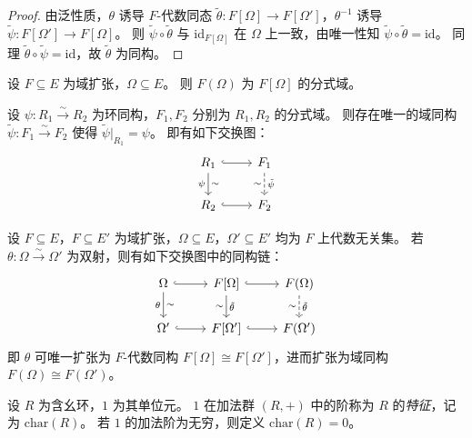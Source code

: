 \documentclass[lang=cn,a4paper,newtx]{elegantbook}
\begin{document}
\begin{proof}
  由泛性质，$\theta$ 诱导 $F$-代数同态 $\tilde\theta\colon F[\Omega]\to F[\Omega']$，$\theta^{-1}$ 诱导 $\tilde\psi\colon F[\Omega']\to F[\Omega]$。
  则 $\tilde\psi\circ\tilde\theta$ 与 $\mathrm{id}_{F[\Omega]}$ 在 $\Omega$ 上一致，由唯一性知 $\tilde\psi\circ\tilde\theta=\mathrm{id}$。
  同理 $\tilde\theta\circ\tilde\psi=\mathrm{id}$，故 $\tilde\theta$ 为同构。
\end{proof}

\begin{proposition}
  设 $F\subseteq E$ 为域扩张，$\Omega\subseteq E$。
  则 $F(\Omega)$ 为 $F[\Omega]$ 的分式域。
\end{proposition}

\begin{proposition}
  设 $\psi\colon R_1\xrightarrow{\sim} R_2$ 为环同构，$F_1,F_2$ 分别为 $R_1,R_2$ 的分式域。
  则存在唯一的域同构 $\tilde\psi\colon F_1\xrightarrow{\sim} F_2$ 使得 $\tilde\psi\big|_{R_1}=\psi$。
  即有如下交换图：
  \[
    \begin{tikzcd}
      R_1 \arrow[r,hook] \arrow[d,"\psi"',"\sim"] & F_1 \arrow[d,dashed,"\tilde\psi","\sim"'] \\
      R_2 \arrow[r,hook] & F_2
    \end{tikzcd}
  \]
\end{proposition}

\begin{corollary}
  设 $F\subseteq E$，$F\subseteq E'$ 为域扩张，$\Omega\subseteq E$，$\Omega'\subseteq E'$ 均为 $F$ 上代数无关集。
  若 $\theta\colon\Omega\xrightarrow{\sim}\Omega'$ 为双射，则有如下交换图中的同构链：
  \[
    \begin{tikzcd}
      \Omega \arrow[r,hook] \arrow[d,"\theta"',"\sim"] & F[\Omega] \arrow[r,hook] \arrow[d,"\tilde\theta","\sim"'] & F(\Omega) \arrow[d,dashed,"\tilde\theta","\sim"'] \\
      \Omega' \arrow[r,hook] & F[\Omega'] \arrow[r,hook] & F(\Omega')
    \end{tikzcd}
  \]
  即 $\theta$ 可唯一扩张为 $F$-代数同构 $F[\Omega]\cong F[\Omega']$，进而扩张为域同构 $F(\Omega)\cong F(\Omega')$。
\end{corollary}

\begin{definition}[特征]
  设 $R$ 为含幺环，$1$ 为其单位元。
  $1$ 在加法群 $(R,+)$ 中的阶称为 $R$ 的\emph{特征}，记为 $\mathrm{char}(R)$。
  若 $1$ 的加法阶为无穷，则定义 $\mathrm{char}(R)=0$。
\end{definition}
\end{document}
